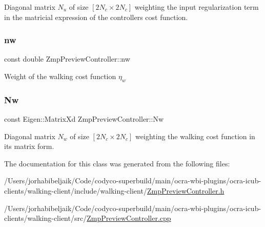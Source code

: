Diagonal matrix $N_u$ of size $[2N_c \times 2N_c]$ weighting the input regularization term in the matricial expression of the controller\textquotesingle{}s cost function. \hypertarget{classZmpPreviewController_a783427b817d77469e1f80426bede5310}{}\label{classZmpPreviewController_a783427b817d77469e1f80426bede5310} 
\subsubsection{\texorpdfstring{nw}{nw}}
{\footnotesize\ttfamily const double Zmp\+Preview\+Controller\+::nw\hspace{0.3cm}{\ttfamily [private]}}

Weight of the walking cost function $ \eta_w $ \hypertarget{classZmpPreviewController_a5e85354a1a7c3f2a8e265dbe7367051c}{}\label{classZmpPreviewController_a5e85354a1a7c3f2a8e265dbe7367051c} 
\subsubsection{\texorpdfstring{Nw}{Nw}}
{\footnotesize\ttfamily const Eigen\+::\+Matrix\+Xd Zmp\+Preview\+Controller\+::\+Nw\hspace{0.3cm}{\ttfamily [private]}}

Diagonal matrix $N_w$ of size $[2N_c \times 2N_c]$ weighting the walking cost function in its matrix form. 

The documentation for this class was generated from the following files\+:\begin{DoxyCompactItemize}
\item 
/\+Users/jorhabibeljaik/\+Code/codyco-\/superbuild/main/ocra-\/wbi-\/plugins/ocra-\/icub-\/clients/walking-\/client/include/walking-\/client/\hyperlink{ZmpPreviewController_8h}{Zmp\+Preview\+Controller.\+h}\item 
/\+Users/jorhabibeljaik/\+Code/codyco-\/superbuild/main/ocra-\/wbi-\/plugins/ocra-\/icub-\/clients/walking-\/client/src/\hyperlink{ZmpPreviewController_8cpp}{Zmp\+Preview\+Controller.\+cpp}\end{DoxyCompactItemize}
